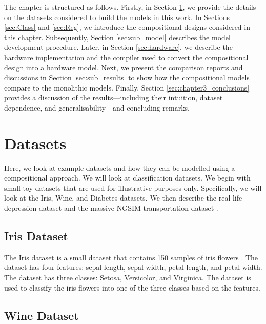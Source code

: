 The chapter is structured as follows. Firstly, in Section \ref{sec:sub_datasets}, we provide the details on the datasets considered to build the models in this work. In Sections \ref{sec:Class} and \ref{sec:Reg}, we introduce the compositional designs considered in this chapter. Subsequently, Section \ref{sec:sub_model} describes the model development procedure. Later, in Section \ref{sec:hardware}, we describe the hardware implementation and the compiler used to convert the compositional design into a hardware model. Next, we present the comparison reports and discussions in Section \ref{sec:sub_results} to show how the compositional models compare to the monolithic models. Finally, Section \ref{sec:chapter3_conclusions} provides a discussion of the results---including their intuition, dataset dependence, and generalisability---and concluding remarks.


% 


\section{Datasets}
\label{sec:sub_datasets}


Here, we look at example datasets and how they can be modelled using a compositional approach. We will look at classification datasets. We begin with small toy datasets that are used for illustrative purposes only. Specifically, we will look at the Iris, Wine, and Diabetes datasets. We then describe the real-life depression dataset \cite{shah_personalized_2021} and the massive NGSIM transportation dataset \cite{administration_next_2016}. 


\subsection{Iris Dataset}
\label{sec:sub_sub_iris}

The Iris dataset is a small dataset that contains 150 samples of iris flowers \cite{fisher_use_1936}. The dataset has four features: sepal length, sepal width, petal length, and petal width. The dataset has three classes: Setosa, Versicolor, and Virginica. The dataset is used to classify the iris flowers into one of the three classes based on the features. 

\subsection{Wine Dataset}
\label{sec:sub_sub_wine}

